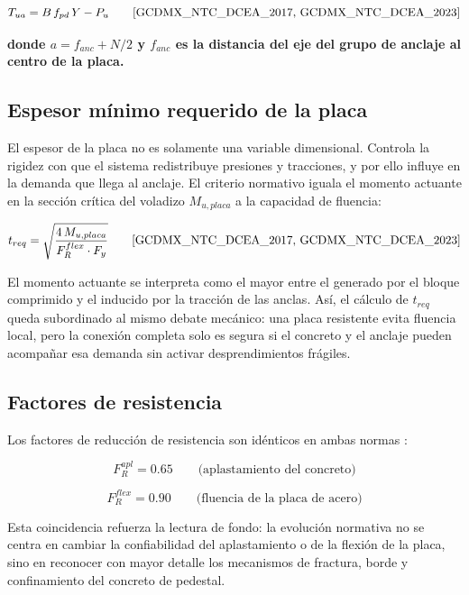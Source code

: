 \begin{equation}
  T_{ua} = B\,f_{pd}\,Y - P_u
  \qquad \text{\cite{GCDMX_NTC_DCEA_2017, GCDMX_NTC_DCEA_2023}}
  \label{eq:Tua}
\end{equation}

\noindent\textbf{donde $a=f_{anc}+N/2$ y $f_{anc}$ es la distancia del eje del grupo de anclaje al centro de la placa.}

\subsection{Espesor mínimo requerido de la placa}

El espesor de la placa no es solamente una variable dimensional. Controla la rigidez con que el sistema redistribuye presiones y tracciones, y por ello influye en la demanda que llega al anclaje. El criterio normativo iguala el momento actuante en la sección crítica del voladizo $M_{u,placa}$ a la capacidad de fluencia:

\begin{equation}
  t_{req} = \sqrt{\frac{4\,M_{u,placa}}{F_R^{flex}\cdot F_y}}
  \qquad \text{\cite{GCDMX_NTC_DCEA_2017, GCDMX_NTC_DCEA_2023}}
  \label{eq:treq}
\end{equation}

El momento actuante se interpreta como el mayor entre el generado por el bloque comprimido y el inducido por la tracción de las anclas. Así, el cálculo de $t_{req}$ queda subordinado al mismo debate mecánico: una placa resistente evita fluencia local, pero la conexión completa solo es segura si el concreto y el anclaje pueden acompañar esa demanda sin activar desprendimientos frágiles.

\subsection{Factores de resistencia}

Los factores de reducción de resistencia son idénticos en ambas normas \cite{GCDMX_NTC_DCEA_2017, GCDMX_NTC_DCEA_2023}:

\begin{equation}
  F_R^{apl} = 0.65 \qquad \text{(aplastamiento del concreto)}
\end{equation}

\begin{equation}
  F_R^{flex} = 0.90 \qquad \text{(fluencia de la placa de acero)}
\end{equation}

Esta coincidencia refuerza la lectura de fondo: la evolución normativa no se centra en cambiar la confiabilidad del aplastamiento o de la flexión de la placa, sino en reconocer con mayor detalle los mecanismos de fractura, borde y confinamiento del concreto de pedestal.

